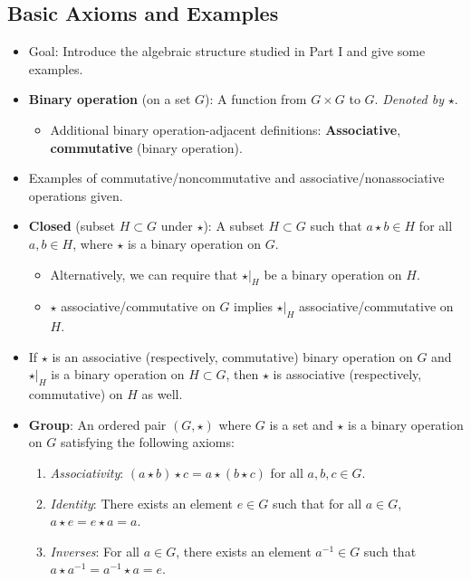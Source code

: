 \documentclass[../notes.tex]{subfiles}
\begin{document}
\subsection*{Basic Axioms and Examples}
\begin{itemize}
    \item Goal: Introduce the algebraic structure studied in Part I and give some examples.
    \item \textbf{Binary operation} (on a set $G$): A function from $G\times G$ to $G$. \emph{Denoted by} $\bm{\star}$.
    \begin{itemize}
        \item Additional binary operation-adjacent definitions: \textbf{Associative}, \textbf{commutative} (binary operation).
    \end{itemize}
    \item Examples of commutative/noncommutative and associative/nonassociative operations given.
    \item \textbf{Closed} (subset $H\subset G$ under $\star$): A subset $H\subset G$ such that $a\star b\in H$ for all $a,b\in H$, where $\star$ is a binary operation on $G$.
    \begin{itemize}
        \item Alternatively, we can require that $\star|_H$ be a binary operation on $H$.
        \item $\star$ associative/commutative on $G$ implies $\star|_H$ associative/commutative on $H$.
    \end{itemize}
    \item If $\star$ is an associative (respectively, commutative) binary operation on $G$ and $\star|_H$ is a binary operation on $H\subset G$, then $\star$ is associative (respectively, commutative) on $H$ as well.
    \item \textbf{Group}: An ordered pair $(G,\star)$ where $G$ is a set and $\star$ is a binary operation on $G$ satisfying the following axioms:
    \begin{enumerate}[label={(\roman*)}]
        \item \emph{Associativity}: $(a\star b)\star c=a\star(b\star c)$ for all $a,b,c\in G$.
        \item \emph{Identity}: There exists an element $e\in G$ such that for all $a\in G$, $a\star e=e\star a=a$.
        \item \emph{Inverses}: For all $a\in G$, there exists an element $a^{-1}\in G$ such that $a\star a^{-1}=a^{-1}\star a=e$.
    \end{enumerate}

\end{itemize}
\end{document}
